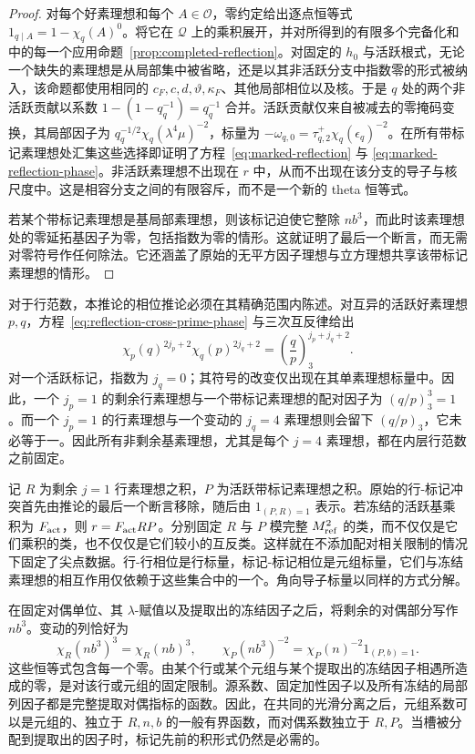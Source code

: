 \begin{proof}
对每个好素理想和每个 \(A\in\mathcal O\)，零约定给出逐点恒等式 \(1_{q\mid A}=1-\chi_q(A)^0\)。将它在 \(\mathcal Q\) 上的乘积展开，并对所得到的有限多个完备化和中的每一个应用命题~\ref{prop:completed-reflection}。对固定的 \(h_0\) 与活跃根式，无论一个缺失的素理想是从局部集中被省略，还是以其非活跃分支中指数零的形式被纳入，该命题都使用相同的 \(c_F,c,d,\vartheta,\kappa_F\)、其他局部相位以及核。于是 \(q\) 处的两个非活跃贡献以系数 \(1-(1-q_q^{-1})=q_q^{-1}\) 合并。活跃贡献仅来自被减去的零掩码变换，其局部因子为 \(q_q^{-1/2}\chi_q(\lambda^4\mu)^{-2}\)，标量为 \(-\omega_{q,0}=\tau_{q,2}^{+}\chi_q(\epsilon_q)^{-2}\)。在所有带标记素理想处汇集这些选择即证明了方程~\eqref{eq:marked-reflection} 与 \eqref{eq:marked-reflection-phase}。非活跃素理想不出现在 \(r\) 中，从而不出现在该分支的导子与核尺度中。这是相容分支之间的有限容斥，而不是一个新的 theta 恒等式。

若某个带标记素理想是基局部素理想，则该标记迫使它整除 \(nb^3\)，而此时该素理想处的零延拓基因子为零，包括指数为零的情形。这就证明了最后一个断言，而无需对零符号作任何除法。它还涵盖了原始的无平方因子理想与立方理想共享该带标记素理想的情形。
\end{proof}

对于行范数，本推论的相位推论必须在其精确范围内陈述。对互异的活跃好素理想 \(p,q\)，方程~\eqref{eq:reflection-cross-prime-phase} 与三次互反律给出
\begin{equation}\label{eq:reflection-pair-phase}
 \chi_p(q)^{2j_p+2}\chi_q(p)^{2j_q+2}
       =\left(\frac qp\right)_3^{j_p+j_q+2}.
\end{equation}
对一个活跃标记，指数为 \(j_q=0\)；其符号的改变仅出现在其单素理想标量中。因此，一个 \(j_p=1\) 的剩余行素理想与一个带标记素理想的配对因子为 \((q/p)_3^3=1\)。而一个 \(j_p=1\) 的行素理想与一个变动的 \(j_q=4\) 素理想则会留下 \((q/p)_3\)，它未必等于一。因此所有非剩余基素理想，尤其是每个 \(j=4\) 素理想，都在内层行范数之前固定。

记 \(R\) 为剩余 \(j=1\) 行素理想之积，\(P\) 为活跃带标记素理想之积。原始的行-标记冲突首先由推论的最后一个断言移除，随后由 \(1_{(P,R)=1}\) 表示。若冻结的活跃基乘积为 \(F_{\rm act}\)，则 \(r=F_{\rm act}RP\)。分别固定 \(R\) 与 \(P\) 模完整 \(M_{\rm ref}^2\) 的类，而不仅仅是它们乘积的类，也不仅仅是它们较小的互反类。这样就在不添加配对相关限制的情况下固定了尖点数据。行-行相位是行标量，标记-标记相位是元组标量，它们与冻结素理想的相互作用仅依赖于这些集合中的一个。角向导子标量以同样的方式分解。

在固定对偶单位、其 \(\lambda\)-赋值以及提取出的冻结因子之后，将剩余的对偶部分写作 \(nb^3\)。变动的列恰好为
\[
 \chi_R(nb^3)^3=\chi_R(nb)^3,\qquad
 \chi_P(nb^3)^{-2}=\chi_P(n)^{-2}1_{(P,b)=1}.
\]
这些恒等式包含每一个零。由某个行或某个元组与某个提取出的冻结因子相遇所造成的零，是对该行或元组的固定限制。源系数、固定加性因子以及所有冻结的局部列因子都是完整提取对偶指标的函数。因此，在共同的光滑分离之后，元组系数可以是元组的、独立于 \(R,n,b\) 的一般有界函数，而对偶系数独立于 \(R,P\)。当槽被分配到提取出的因子时，标记先前的积形式仍然是必需的。

